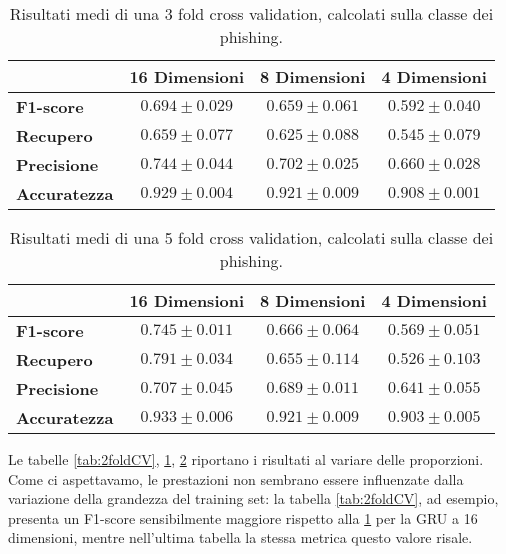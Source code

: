 \documentclass[../../main.tex]{subfiles}
\begin{document}
    \begin{table}[H]
        \centering
        \begin{tabular}{lccc}
            \toprule
            {} &                      \textbf{16 Dimensioni} & \textbf{8 Dimensioni} & \textbf{4 Dimensioni} \\
            \midrule
            \textbf{F1-score }      &      $0.694 \pm 0.029$ & $0.659 \pm 0.061$ & $0.592 \pm 0.040$\\
            \textbf{Recupero   }    &      $0.659 \pm 0.077$ & $0.625 \pm 0.088$ & $0.545 \pm 0.079$\\
            \textbf{Precisione}     &      $0.744 \pm 0.044$ & $0.702 \pm 0.025$ & $0.660 \pm 0.028$\\
            \textbf{Accuratezza }   &      $0.929 \pm 0.004$ & $0.921 \pm 0.009$ & $0.908 \pm 0.001$\\
            \bottomrule
        \end{tabular}
        \caption{Risultati medi di una 3 fold cross validation, calcolati sulla classe dei phishing.}
        \label{tab:3foldCV}
    \end{table}

    \begin{table}[H]
        \centering
        \begin{tabular}{lccc}
            \toprule
            {} &                      \textbf{16 Dimensioni} & \textbf{8 Dimensioni} & \textbf{4 Dimensioni} \\
            \midrule
            \textbf{F1-score }      &      $0.745 \pm 0.011$ & $0.666 \pm 0.064$ & $0.569 \pm 0.051$\\
            \textbf{Recupero   }    &      $0.791 \pm 0.034$ & $0.655 \pm 0.114$ & $0.526 \pm 0.103$\\
            \textbf{Precisione}     &      $0.707 \pm 0.045$ & $0.689 \pm 0.011$ & $0.641 \pm 0.055$\\
            \textbf{Accuratezza }      &      $0.933 \pm 0.006$ & $0.921 \pm 0.009$ & $0.903 \pm 0.005$\\
            \bottomrule
        \end{tabular}
        \caption{Risultati medi di una 5 fold cross validation, calcolati sulla classe dei phishing.}
        \label{tab:5foldCV}
    \end{table}

    Le tabelle \ref{tab:2foldCV}, \ref{tab:3foldCV}, \ref{tab:5foldCV} riportano i risultati al variare delle proporzioni. Come ci aspettavamo, le prestazioni non sembrano essere influenzate dalla variazione della grandezza del training set: la tabella \ref{tab:2foldCV}, ad esempio, presenta un F1-score sensibilmente maggiore rispetto alla \ref{tab:3foldCV} per la GRU a 16 dimensioni, mentre nell'ultima tabella la stessa metrica questo valore risale.
\end{document}
